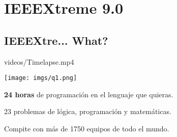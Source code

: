
\section{IEEEXtreme 9.0}
\subsection{IEEEXtre... What?}

\begin{frame}
	       {videos/Timelapse.mp4}
\end{frame}

\begin{frame}
	\texttt{[image: imgs/q1.png]}

  	\begin{wideitemize}
  		\item \textbf{24 horas} de programación en el lenguaje que quieras.
  		\item 23 problemas de lógica, programación y matemáticas.
  		\item Compite con más de 1750 equipos de todo el mundo.
  	\end{wideitemize}
\end{frame}